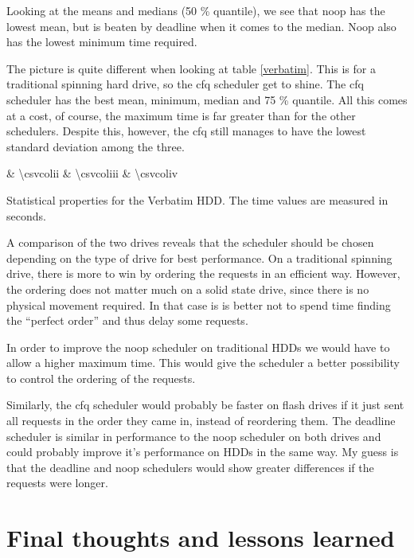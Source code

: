 \documentclass[12pt, a4paper]{article} %
\begin{document}
Looking at the means and medians (50 \% quantile), we see that noop has the lowest mean, but is beaten by deadline when it comes to the median.
Noop also has the lowest minimum time required.

The picture is quite different when looking at table \ref{verbatim}.
This is for a traditional spinning hard drive, so the cfq scheduler get to shine.
The cfq scheduler has the best mean, minimum, median and 75 \% quantile.
All this comes at a cost, of course, the maximum time is far greater than for the other schedulers.
Despite this, however, the cfq still manages to have the lowest standard deviation among the three.

\begin{table}[ht]
	\centering
	{\csvcoli & \num{\csvcolii} & \num{\csvcoliii} & \num{\csvcoliv}}
	\caption{Statistical properties for the Verbatim HDD. The time values are measured in seconds.}
	\label{verbatim}
\end{table}

A comparison of the two drives reveals that the scheduler should be chosen depending on the type of drive for best performance.
On a traditional spinning drive, there is more to win by ordering the requests in an efficient way.
However, the ordering does not matter much on a solid state drive, since there is no physical movement required.
In that case is is better not to spend time finding the ``perfect order'' and thus delay some requests.

In order to improve the noop scheduler on traditional HDDs we would have to allow a higher maximum time.
This would give the scheduler a better possibility to control the ordering of the requests.

Similarly, the cfq scheduler would probably be faster on flash drives if it just sent all requests in the order they came in, instead of reordering them.
The deadline scheduler is similar in performance to the noop scheduler on both drives and could probably improve it's performance on HDDs in the same way.
My guess is that the deadline and noop schedulers would show greater differences if the requests were longer.



\section{Final thoughts and lessons learned}
\end{document}
